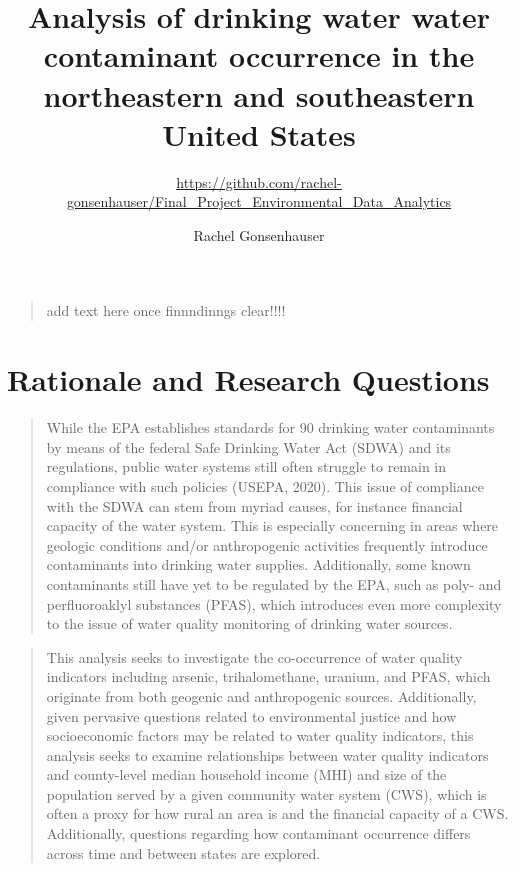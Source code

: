 \documentclass[12pt,]{article}
\title{Analysis of drinking water water contaminant occurrence in the
northeastern and southeastern United States}
\subtitle{\url{https://github.com/rachel-gonsenhauser/Final_Project_Environmental_Data_Analytics}}
\author{Rachel Gonsenhauser}
\date{}
\begin{document}
\maketitle

\newpage
\abstract

\begin{quote}
add text here once finnndinngs clear!!!!
\end{quote}

\newpage
\tableofcontents 
\newpage
\listoftables 
\newpage
\listoffigures 
\newpage

\hypertarget{rationale-and-research-questions}{%
\section{Rationale and Research
Questions}\label{rationale-and-research-questions}}

\begin{quote}
While the EPA establishes standards for 90 drinking water contaminants
by means of the federal Safe Drinking Water Act (SDWA) and its
regulations, public water systems still often struggle to remain in
compliance with such policies (USEPA, 2020). This issue of compliance
with the SDWA can stem from myriad causes, for instance financial
capacity of the water system. This is especially concerning in areas
where geologic conditions and/or anthropogenic activities frequently
introduce contaminants into drinking water supplies. Additionally, some
known contaminants still have yet to be regulated by the EPA, such as
poly- and perfluoroaklyl substances (PFAS), which introduces even more
complexity to the issue of water quality monitoring of drinking water
sources.
\end{quote}

\begin{quote}
This analysis seeks to investigate the co-occurrence of water quality
indicators including arsenic, trihalomethane, uranium, and PFAS, which
originate from both geogenic and anthropogenic sources. Additionally,
given pervasive questions related to environmental justice and how
socioeconomic factors may be related to water quality indicators, this
analysis seeks to examine relationships between water quality indicators
and county-level median household income (MHI) and size of the
population served by a given community water system (CWS), which is
often a proxy for how rural an area is and the financial capacity of a
CWS. Additionally, questions regarding how contaminant occurrence
differs across time and between states are explored.
\end{quote}
\end{document}
